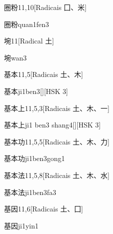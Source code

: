 \begin{entry}{圈粉}{11,10}[Radicais ⼞、⽶]
  \begin{phonetics}{圈粉}{quan1fen3}
  \end{phonetics}
\end{entry}

\begin{entry}{埦}{11}[Radical ⼟]
  \begin{phonetics}{埦}{wan3}
  \end{phonetics}
\end{entry}

\begin{entry}{基本}{11,5}[Radicais ⼟、⽊]
  \begin{phonetics}{基本}{ji1ben3}[][HSK 3]
  \end{phonetics}
\end{entry}

\begin{entry}{基本上}{11,5,3}[Radicais ⼟、⽊、⼀]
  \begin{phonetics}{基本上}{ji1 ben3 shang4}[][HSK 3]
  \end{phonetics}
\end{entry}

\begin{entry}{基本功}{11,5,5}[Radicais ⼟、⽊、⼒]
  \begin{phonetics}{基本功}{ji1ben3gong1}
  \end{phonetics}
\end{entry}

\begin{entry}{基本法}{11,5,8}[Radicais ⼟、⽊、⽔]
  \begin{phonetics}{基本法}{ji1ben3fa3}
  \end{phonetics}
\end{entry}

\begin{entry}{基因}{11,6}[Radicais ⼟、⼞]
  \begin{phonetics}{基因}{ji1yin1}
  \end{phonetics}
\end{entry}

